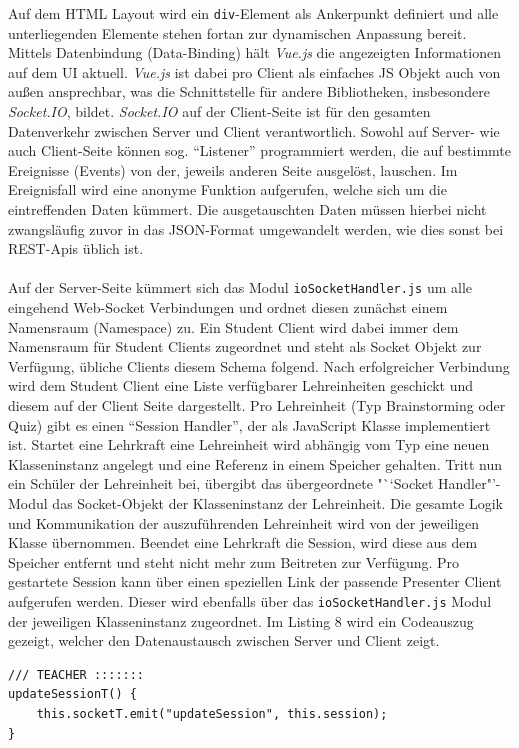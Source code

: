 Auf dem HTML Layout wird ein \texttt{div}-Element als Ankerpunkt definiert und alle unterliegenden Elemente stehen fortan zur dynamischen Anpassung bereit. Mittels Datenbindung (Data-Binding) hält \emph{Vue.js} die angezeigten Informationen auf dem UI aktuell. \emph{Vue.js} ist dabei pro Client als einfaches JS Objekt auch von außen ansprechbar, was die Schnittstelle für andere Bibliotheken, insbesondere \emph{Socket.IO}, bildet. \emph{Socket.IO} auf der Client-Seite ist für den gesamten Datenverkehr zwischen Server und Client verantwortlich. Sowohl auf Server- wie auch Client-Seite können sog. "`Listener"' programmiert werden, die auf bestimmte Ereignisse (Events) von der, jeweils anderen Seite ausgelöst, lauschen. Im Ereignisfall wird eine anonyme Funktion aufgerufen, welche sich um die eintreffenden Daten kümmert. Die ausgetauschten Daten müssen hierbei nicht zwangsläufig zuvor in das  JSON-Format umgewandelt werden, wie dies sonst bei REST-Apis üblich ist. \\ \\ Auf der Server-Seite kümmert sich das Modul \texttt{ioSocketHandler.js} um alle eingehend Web-Socket Verbindungen und ordnet diesen zunächst einem Namensraum (Name\-space) zu. Ein Student Client wird dabei immer dem Namensraum für Student Clients zugeordnet und steht als Socket Objekt zur Verfügung, übliche Clients diesem Schema folgend.  Nach erfolgreicher Verbindung wird dem Student Client eine Liste verfügbarer Lehreinheiten geschickt und diesem auf der Client Seite dargestellt. Pro Lehreinheit (Typ Brainstorming oder Quiz) gibt es einen "`Session Handler"', der als JavaScript Klasse implementiert ist. Startet eine Lehrkraft eine Lehreinheit wird abhängig vom Typ eine neuen Klasseninstanz angelegt und eine Referenz in einem Speicher gehalten. Tritt nun ein Schüler der Lehreinheit bei, übergibt das übergeordnete "``Socket Handler"'-Modul das Socket-Objekt der Klasseninstanz der Lehreinheit. Die gesamte Logik und Kommunikation der auszuführenden Lehreinheit wird von der jeweiligen Klasse übernommen. Beendet eine Lehrkraft die Session, wird diese aus dem Speicher entfernt und steht nicht mehr zum Beitreten zur Verfügung. Pro gestartete Session kann über einen speziellen Link der passende Presenter Client aufgerufen werden. Dieser wird ebenfalls über das \texttt{ioSocketHandler.js} Modul der jeweiligen Klasseninstanz zugeordnet. Im Listing 8 wird ein Codeauszug gezeigt, welcher den Datenaustausch zwischen Server und Client zeigt.
\begin{lstlisting}[caption=Server Socket Event-Emitierung]
/// TEACHER :::::::
updateSessionT() {
	this.socketT.emit("updateSession", this.session);
}
\end{lstlisting}

